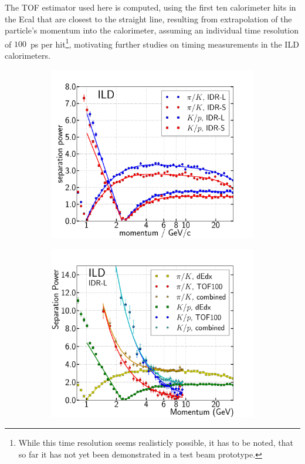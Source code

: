 The TOF estimator used here is computed, using the first ten calorimeter hits in the Ecal that are closest to the straight line,
resulting from extrapolation of the particle's momentum into the calorimeter, assuming an individual time resolution of $100$~ps
per hit\footnote{While this time resolution seems realisticly possible, it has to be noted, that so far it has not yet been demonstrated
  in a test beam prototype.}, motivating further studies on timing measurements in the ILD calorimeters.
%
% 
\begin{figure}[htbp]
\begin{subfigure}{0.49\hsize}
 \includegraphics[width=\hsize]{Performance/fig/dEdx_ILDls_separation_power.pdf}
 \caption{ \label{fig:perf:dedx_sep}}
 \end{subfigure}
\begin{subfigure}{0.49\hsize}
 \includegraphics[width=\hsize]{Performance/fig/Combined_dEdx_TOF100.pdf}

\end{subfigure}
\end{figure}
